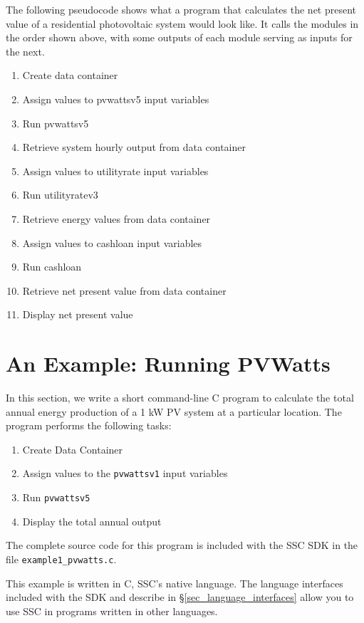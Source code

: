 \documentclass{scrartcl} %
\begin{document}
The following pseudocode shows what a program that calculates the net present value of a residential photovoltaic system would look like. It calls the modules in the order shown above, with some outputs of each module serving as inputs for the next.

\begin{enumerate}
\item Create data container
\item Assign values to pvwattsv5 input variables
\item Run pvwattsv5
\item Retrieve system hourly output from data container
\item Assign values to utilityrate input variables
\item Run utilityratev3
\item Retrieve energy values from data container
\item Assign values to cashloan input variables
\item Run cashloan
\item Retrieve net present value from data container
\item Display net present value
\end{enumerate}

\section{An Example: Running PVWatts}
\label{sec_pvwatts_example}

In this section, we write a short command-line C program to calculate the total annual energy production of a 1 kW PV system at a particular location. The program performs the following tasks:

\begin{enumerate}
\item Create Data Container
\item Assign values to the \texttt{pvwattsv1} input variables
\item Run \texttt{pvwattsv5}
\item Display the total annual output
\end{enumerate}

The complete source code for this program is included with the SSC SDK in the file \texttt{example1\_pvwatts.c}.

This example is written in C, SSC's native language. The language interfaces included with the SDK and describe in \S\ref{sec_language_interfaces} allow you to use SSC in programs written in other languages.
\end{document}
